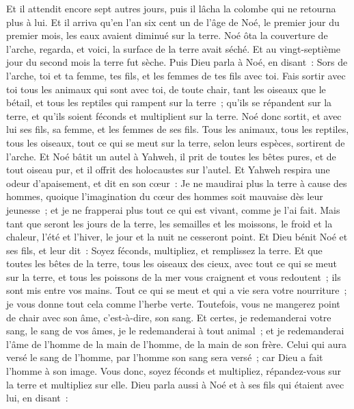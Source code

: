 \begin{multicols}{2}
Et il attendit encore sept autres jours, puis il lâcha la colombe qui ne retourna plus à lui.
Et il arriva qu'en l'an six cent un de l'âge de Noé, le premier jour du premier mois, les eaux avaient diminué sur la terre. Noé ôta la couverture de l'arche, regarda, et voici, la surface de la terre avait séché.
Et au vingt-septième jour du second mois la terre fut sèche.
Puis Dieu parla à Noé, en disant~:
Sors de l'arche, toi et ta femme, tes fils, et les femmes de tes fils avec toi.
Fais sortir avec toi tous les animaux qui sont avec toi, de toute chair, tant les oiseaux que le bétail, et tous les reptiles qui rampent sur la terre~; qu'ils se répandent sur la terre, et qu'ils soient féconds et multiplient sur la terre.
Noé donc sortit, et avec lui ses fils, sa femme, et les femmes de ses fils.
Tous les animaux, tous les reptiles, tous les oiseaux, tout ce qui se meut sur la terre, selon leurs espèces, sortirent de l'arche.
Et Noé bâtit un autel à Yahweh, il prit de toutes les bêtes pures, et de tout oiseau pur, et il offrit des holocaustes sur l'autel.
Et Yahweh respira une odeur d'apaisement, et dit en son cœur~: Je ne maudirai plus la terre à cause des hommes, quoique l'imagination du cœur des hommes soit mauvaise dès leur jeunesse~; et je ne frapperai plus tout ce qui est vivant, comme je l'ai fait.
Mais tant que seront les jours de la terre, les semailles et les moissons, le froid et la chaleur, l'été et l'hiver, le jour et la nuit ne cesseront point.
\VerseOne{}Et Dieu bénit Noé et ses fils, et leur dit~: Soyez féconds, multipliez, et remplissez la terre.
Et que toutes les bêtes de la terre, tous les oiseaux des cieux, avec tout ce qui se meut sur la terre, et tous les poissons de la mer vous craignent et vous redoutent~; ils sont mis entre vos mains.
Tout ce qui se meut et qui a vie sera votre nourriture~; je vous donne tout cela comme l'herbe verte.
Toutefois, vous ne mangerez point de chair avec son âme, c'est-à-dire, son sang.
Et certes, je redemanderai votre sang, le sang de vos âmes, je le redemanderai à tout animal~; et je redemanderai l'âme de l'homme de la main de l'homme, de la main de son frère.
Celui qui aura versé le sang de l'homme, par l'homme son sang sera versé~; car Dieu a fait l'homme à son image.
Vous donc, soyez féconds et multipliez, répandez-vous sur la terre et multipliez sur elle.
Dieu parla aussi à Noé et à ses fils qui étaient avec lui, en disant~:

\end{multicols}
